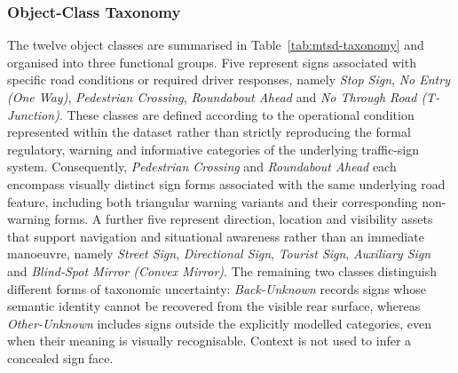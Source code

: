 \subsubsection{Object-Class Taxonomy}
\label{sec:bg-mtsd-taxonomy}
The twelve object classes are summarised in Table~\ref{tab:mtsd-taxonomy} and organised into three functional groups. Five represent signs associated with specific road conditions or required driver responses, namely \emph{Stop Sign}, \emph{No Entry (One Way)}, \emph{Pedestrian Crossing}, \emph{Roundabout Ahead} and \emph{No Through Road (T-Junction)}. These classes are defined according to the operational condition represented within the dataset rather than strictly reproducing the formal regulatory, warning and informative categories of the underlying traffic-sign system. Consequently, \emph{Pedestrian Crossing} and \emph{Roundabout Ahead} each encompass visually distinct sign forms associated with the same underlying road feature, including both triangular warning variants and their corresponding non-warning forms. A further five represent direction, location and visibility assets that support navigation and situational awareness rather than an immediate manoeuvre, namely \emph{Street Sign}, \emph{Directional Sign}, \emph{Tourist Sign}, \emph{Auxiliary Sign} and \emph{Blind-Spot Mirror (Convex Mirror)}. The remaining two classes distinguish different forms of taxonomic uncertainty: \emph{Back-Unknown} records signs whose semantic identity cannot be recovered from the visible rear surface, whereas \emph{Other-Unknown} includes signs outside the explicitly modelled categories, even when their meaning is visually recognisable. Context is not used to infer a concealed sign face.

